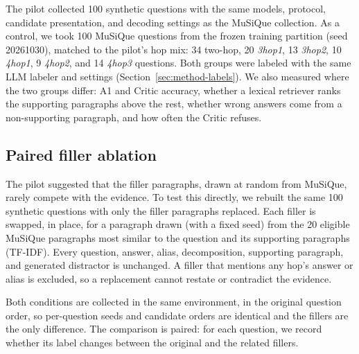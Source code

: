 The pilot collected 100 synthetic questions with the same models, protocol,
candidate presentation, and decoding settings as the MuSiQue collection. As
a control, we took 100 MuSiQue questions from the frozen training partition
(seed 20261030), matched to the pilot's hop mix: 34 two-hop, 20 \textit{3hop1},
13 \textit{3hop2}, 10 \textit{4hop1}, 9 \textit{4hop2}, and 14 \textit{4hop3}
questions. Both groups were labeled with the same LLM labeler and settings
(Section~\ref{sec:method-labels}). We also measured where the two groups
differ: A1 and Critic accuracy, whether a lexical retriever ranks the
supporting paragraphs above the rest, whether wrong answers come from a
non-supporting paragraph, and how often the Critic refuses.

\subsection{Paired filler ablation}
\label{sec:exp-fillers}

The pilot suggested that the filler paragraphs, drawn at random from
MuSiQue, rarely compete with the evidence. To test this directly, we rebuilt
the same 100 synthetic questions with only the filler paragraphs replaced.
Each filler is swapped, in place, for a paragraph drawn (with a fixed seed)
from the 20 eligible MuSiQue paragraphs most similar to the question and its
supporting paragraphs (TF-IDF). Every
question, answer, alias, decomposition, supporting paragraph, and generated
distractor is unchanged. A filler that mentions any hop's answer or alias is
excluded, so a replacement cannot restate or contradict the evidence.

Both conditions are collected in the same environment, in the original
question order, so per-question seeds and candidate orders are identical
and the fillers are the only difference. The comparison is paired: for each
question, we record whether its label changes between the original and the
related fillers.
